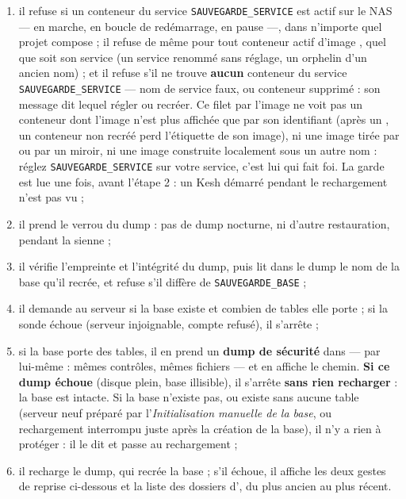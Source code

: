\documentclass[a4paper,11pt,oneside]{article}
\begin{document}
\begin{enumerate}
    \item il refuse si un conteneur du service \texttt{SAUVEGARDE\_SERVICE} est actif sur le NAS --- en marche, en boucle de redémarrage, en pause ---, dans n'importe quel projet compose ; il refuse de même pour tout conteneur actif d'image , quel que soit son service (un service renommé sans réglage, un orphelin d'un ancien nom) ; et il refuse s'il ne trouve \textbf{aucun} conteneur du service \texttt{SAUVEGARDE\_SERVICE} --- nom de service faux, ou conteneur supprimé : son message dit lequel régler ou recréer. Ce filet par l'image ne voit pas un conteneur dont l'image n'est plus affichée que par son identifiant (après un , un conteneur non recréé perd l'étiquette de son image), ni une image tirée par  ou par un miroir, ni une image construite localement sous un autre nom : réglez \texttt{SAUVEGARDE\_SERVICE} sur votre service, c'est lui qui fait foi. La garde est lue une fois, avant l'étape 2 : un Kesh démarré pendant le rechargement n'est pas vu ;
    \item il prend le verrou du dump : pas de dump nocturne, ni d'autre restauration, pendant la sienne ;
    \item il vérifie l'empreinte et l'intégrité du dump, puis lit dans le dump le nom de la base qu'il recrée, et refuse s'il diffère de \texttt{SAUVEGARDE\_BASE} ;
    \item il demande au serveur si la base existe et combien de tables elle porte ; si la sonde échoue (serveur injoignable, compte refusé), il s'arrête ;
    \item si la base porte des tables, il en prend un \textbf{dump de sécurité} dans  --- par  lui-même : mêmes contrôles, mêmes fichiers --- et en affiche le chemin. \textbf{Si ce dump échoue} (disque plein, base illisible), il s'arrête \textbf{sans rien recharger} : la base est intacte. Si la base n'existe pas, ou existe sans aucune table (serveur neuf préparé par l'\emph{Initialisation manuelle de la base}, ou rechargement interrompu juste après la création de la base), il n'y a rien à protéger : il le dit et passe au rechargement ;
    \item il recharge le dump, qui recrée la base ; s'il échoue, il affiche les deux gestes de reprise ci-dessous et la liste des dossiers d', du plus ancien au plus récent.
\end{enumerate}
\end{document}
